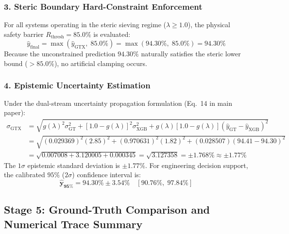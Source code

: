 \documentclass[11pt]{article}
\begin{document}
\subsubsection{3. Steric Boundary Hard-Constraint Enforcement}
For all systems operating in the steric sieving regime ($\lambda \ge 1.0$), the physical safety barrier $R_{\mathrm{thresh}} = 85.0\%$ is evaluated:
\begin{equation}
\hat{y}_{\mathrm{final}} = \max\left(\hat{y}_{\mathrm{GTX}}, \; 85.0\%\right) = \max(94.30\%, \; 85.0\%) = \mathbf{94.30\%}
\end{equation}
Because the unconstrained prediction $94.30\%$ naturally satisfies the steric lower bound ($>85.0\%$), no artificial clamping occurs.

\subsubsection{4. Epistemic Uncertainty Estimation}
Under the dual-stream uncertainty propagation formulation (Eq.~14 in main paper):
\begin{align}
\sigma_{\mathrm{GTX}} &= \sqrt{g(\lambda)^2 \sigma_{\mathrm{GT}}^2 + [1.0 - g(\lambda)]^2 \sigma_{\mathrm{XGB}}^2 + g(\lambda)[1.0 - g(\lambda)](\hat{y}_{\mathrm{GT}} - \hat{y}_{\mathrm{XGB}})^2} \nonumber \\
&= \sqrt{(0.029369)^2 (2.85)^2 + (0.970631)^2 (1.82)^2 + (0.028507)(94.41 - 94.30)^2} \nonumber \\
&= \sqrt{0.007008 + 3.120005 + 0.000345} = \sqrt{3.127358} = \pm 1.768\% \approx \pm 1.77\%
\end{align}
The $1\sigma$ epistemic standard deviation is $\pm 1.77\%$. For engineering decision support, the calibrated $95\%$ ($2\sigma$) confidence interval is:
\begin{equation}
\mathbf{\hat{y}_{95\%} = 94.30\% \pm 3.54\% \quad \left[90.76\%, \; 97.84\%\right]}
\end{equation}

\subsection{Stage 5: Ground-Truth Comparison and Numerical Trace Summary}
\label{sec:walkthrough_summary}
\end{document}

